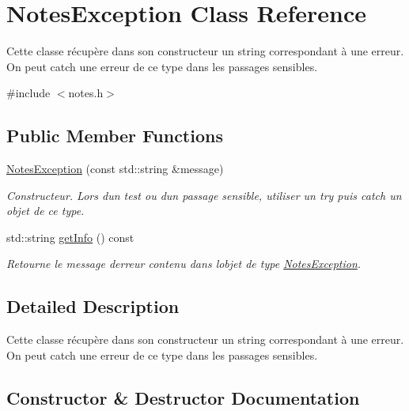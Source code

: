 \hypertarget{class_notes_exception}{}\section{Notes\+Exception Class Reference}
\label{class_notes_exception}


Cette classe récupère dans son constructeur un string correspondant à une erreur. On peut catch une erreur de ce type dans les passages sensibles.  




{\ttfamily \#include $<$notes.\+h$>$}

\subsection*{Public Member Functions}
\begin{DoxyCompactItemize}
\item 
\hyperlink{class_notes_exception_a557a49cbc09d8bcbd088ed09edebd086}{Notes\+Exception} (const std\+::string \&message)
\begin{DoxyCompactList}\small\item\em Constructeur. Lors d\textquotesingle{}un test ou d\textquotesingle{}un passage sensible, utiliser un try puis catch un objet de ce type. \end{DoxyCompactList}\item 
std\+::string \hyperlink{class_notes_exception_a5108cf9d122f28f9cb51c0c31c4f2a35}{get\+Info} () const
\begin{DoxyCompactList}\small\item\em Retourne le message d\textquotesingle{}erreur contenu dans l\textquotesingle{}objet de type \hyperlink{class_notes_exception}{Notes\+Exception}. \end{DoxyCompactList}\end{DoxyCompactItemize}


\subsection{Detailed Description}
Cette classe récupère dans son constructeur un string correspondant à une erreur. On peut catch une erreur de ce type dans les passages sensibles. 

\subsection{Constructor \& Destructor Documentation}
\mbox{\label{class_notes_exception_a557a49cbc09d8bcbd088ed09edebd086}} 
